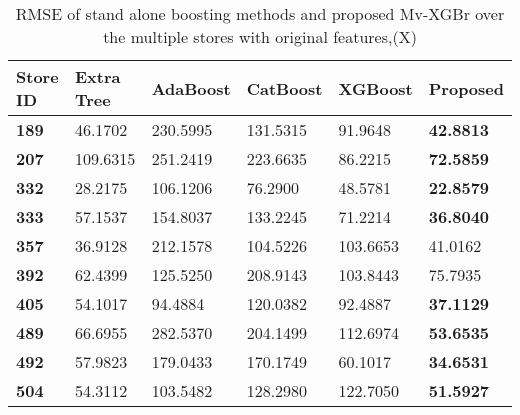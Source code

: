 \begin{table*}[!h]
\centering
\setlength{\tabcolsep}{3pt}
 {\renewcommand{\arraystretch}{1}%
\caption{RMSE of stand alone boosting methods and proposed Mv-XGBr over the multiple stores with original features,(X)}
\label{tab:my-table}
\begin{tabular}{llllll}
\hline \textbf{Store ID} & \textbf{Extra Tree} & \textbf{AdaBoost} & \textbf{CatBoost} & \textbf{XGBoost} & \textbf{Proposed}    \\ \hline
\textbf{189}   & 46.1702             & 230.5995                      & 131.5315                      & 91.9648                      & \textbf{42.8813}  \\
\textbf{207}   & 109.6315            & 251.2419                      & 223.6635                      & 86.2215                      & \textbf{72.5859}  \\
\textbf{332}   & 28.2175             & 106.1206                      & 76.2900                       & 48.5781                      & \textbf{22.8579}  \\
\textbf{333}   & 57.1537             & 154.8037                      & 133.2245                      & 71.2214                      & \textbf{36.8040}  \\
\textbf{357}   & 36.9128             & 212.1578                      & 104.5226                      & 103.6653                     & 41.0162           \\
\textbf{392}   & 62.4399             & 125.5250                      & 208.9143                      & 103.8443                     & 75.7935           \\
\textbf{405}   & 54.1017             & 94.4884                       & 120.0382                      & 92.4887                      & \textbf{37.1129}  \\
\textbf{489}   & 66.6955             & 282.5370                      & 204.1499                      & 112.6974                     & \textbf{53.6535}  \\
\textbf{492}   & 57.9823             & 179.0433                      & 170.1749                      & 60.1017                      & \textbf{34.6531}  \\
\textbf{504}   & 54.3112             & 103.5482                      & 128.2980                      & 122.7050                     & \textbf{51.5927}  \\ \hline
\end{tabular}%
}
\end{table*}

